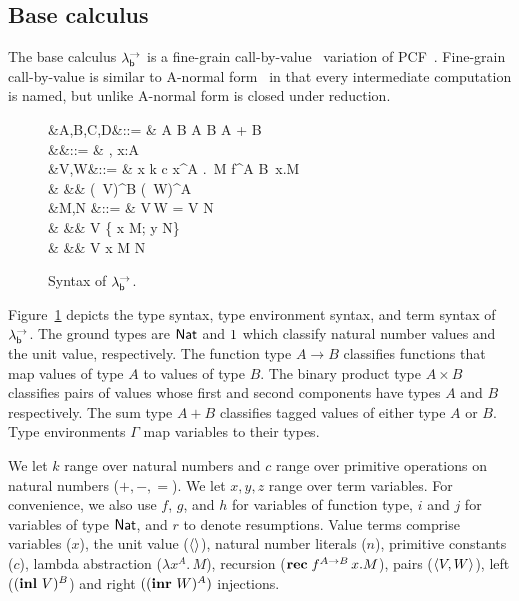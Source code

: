 \documentclass[12pt,phd,lfcs,twoside,openright,logo,leftchapter,normalheadings]{infthesis}
\theoremstyle{plain}
\theoremstyle{definition}
\begin{document}
\subsection{Base calculus}
\label{sec:base-calculus}
The base calculus $\lambda^\rightarrow_{\mathsf{b}}$ is a fine-grain
call-by-value~\cite{LevyPT03} variation of PCF~\cite{Plotkin77}.
%
Fine-grain call-by-value is similar to A-normal
form~\cite{FlanaganSDF93} in that every intermediate computation is
named, but unlike A-normal form is closed under reduction.

\begin{figure}
  \begin{syntax}
              &A,B,C,D\in\TypeCat  &::= & \Nat \mid \One \mid A \to B \mid A \times B \mid A + B \\
     &\Gamma\in\TyEnvCat &::= & \cdot \mid \Gamma, x:A \\
        &V,W\in\ValCat  &::= & x \mid k \mid c \mid \lambda x^A .\, M \mid \Rec \; f^{A \to B}\, x.M \\
                     &               &\mid& \Unit \mid {} \mid (\Inl\, V)^B \mid (\Inr\, W)^A\\
  &M,N\in\CompCat
                           &::= & V\,W
                            \mid  \Let\;  = V \; \In \; N \\
                     &     &\mid&\Case \; V \;\{ \Inl \; x \mapsto M; \Inr \; y \mapsto N\}\\
                     &    &\mid& \Return\; V
                           \mid \Let \; x \revto M \; \In \; N \\
\end{syntax}
\caption{Syntax of $\lambda^\rightarrow_{\mathsf{b}}$.}\label{fig:bpcf}
\end{figure}
%
Figure~\ref{fig:bpcf} depicts the type syntax, type environment
syntax, and term syntax of $\lambda^\rightarrow_{\mathsf{b}}$.
%
The ground types are $\mathsf{Nat}$ and $1$ which classify natural number
values and the unit value, respectively. The function type $A \to B$
classifies functions that map values of type $A$ to values of type
$B$. The binary product type $A \times B$ classifies pairs of values
whose first and second components have types $A$ and $B$
respectively. The sum type $A + B$ classifies tagged values of either
type $A$ or $B$.
%
Type environments $\Gamma$ map variables to their types.

We let $k$ range over natural numbers and $c$ range over primitive
operations on natural numbers ($+, -, =$).
%
We let $x, y, z$ range over term variables.
%
For convenience, we also use $f$, $g$, and $h$ for variables of
function type, $i$ and $j$ for variables of type $\mathsf{Nat}$, and $r$ to
denote resumptions.
%
Value terms comprise variables ($x$), the unit value ($\langle  \rangle$),
natural number literals ($n$), primitive constants ($c$), lambda
abstraction ($\lambda x^A . \, M$), recursion
($\mathbf{rec} \; f^{A \to B}\, x.M$), pairs ($\langle V, W \rangle$), left
($(\mathbf{inl}~V)^B$) and right $((\mathbf{inr}~W)^A)$ injections.
\end{document}
